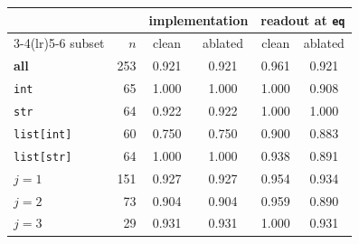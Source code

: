 \begin{tabular}{l r cc cc}
\toprule
 & & \multicolumn{2}{c}{implementation} & \multicolumn{2}{c}{readout at \texttt{eq}} \\
\cmidrule(lr){3-4}\cmidrule(lr){5-6}
subset & $n$ & clean & ablated & clean & ablated \\
\midrule
\textbf{all} & 253 & 0.921 & 0.921 & 0.961 & 0.921 \\
\midrule
\texttt{int} & 65 & 1.000 & 1.000 & 1.000 & 0.908 \\
\texttt{str} & 64 & 0.922 & 0.922 & 1.000 & 1.000 \\
\texttt{list[int]} & 60 & 0.750 & 0.750 & 0.900 & 0.883 \\
\texttt{list[str]} & 64 & 1.000 & 1.000 & 0.938 & 0.891 \\
\midrule
$j=1$ & 151 & 0.927 & 0.927 & 0.954 & 0.934 \\
$j=2$ & 73 & 0.904 & 0.904 & 0.959 & 0.890 \\
$j=3$ & 29 & 0.931 & 0.931 & 1.000 & 0.931 \\
\bottomrule
\end{tabular}
